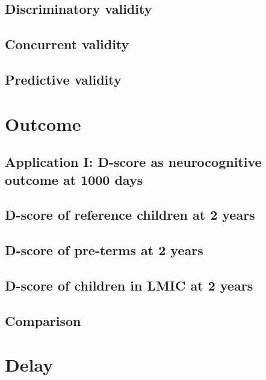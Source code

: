 \documentclass[]{book}
\begin{document}
\section{Discriminatory validity}\label{discriminatory-validity}

\section{Concurrent validity}\label{concurrent-validity}

\section{Predictive validity}\label{predictive-validity}

\chapter{Outcome}\label{outcome}

\section{Application I: D-score as neurocognitive outcome at 1000
days}\label{application-i-d-score-as-neurocognitive-outcome-at-1000-days}

\section{D-score of reference children at 2
years}\label{d-score-of-reference-children-at-2-years}

\section{D-score of pre-terms at 2
years}\label{d-score-of-pre-terms-at-2-years}

\section{D-score of children in LMIC at 2
years}\label{d-score-of-children-in-lmic-at-2-years}

\section{Comparison}\label{comparison}

\chapter{Delay}\label{delay}
\end{document}
